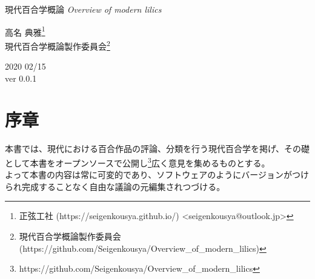 \documentclass[ %
	uplatex,%
	a5paper,%
	papersize%
	]{jsbook}
\begin{document}
						\begin{titlepage}
							\pagecolor{black}
							\color{white}
							\renewcommand{\thefootnote}{\textcolor{red}{\fnsymbol{footnote}}}
							
							\begin{center}
								\vspace*{20mm}
								\fontsize{36pt}{0pt} \selectfont
								現代百合学概論
								\vspace*{5mm}
								\fontsize{21pt}{3pt} \selectfont
								{\sl Overview of modern lilics}
								\vspace{30mm}

								{\LARGE 高名 典雅\footnote[2]{\color{white}正弦工社 (https://seigenkousya.github.io/) <seigenkousya@outlook.jp>}}
								\vspace{2mm}\\
								\color{white}
								{\LARGE 現代百合学概論製作委員会\footnote[3]{\color{white}現代百合学概論製作委員会(https://github.com/Seigenkousya/Overview\_of\_modern\_lilics)}}
								\vspace{10mm}\\
		
								\begin{flushright}
									\color{white}
									{\rm \Large 2020 02/15}\vspace{2mm}\\
									{\rm \Large ver 0.0.1}
								\end{flushright}

								\vspace{10mm}
							\end{center}
						\end{titlepage}

						\pagecolor{white}
						\color{black}
						\frontmatter

						\chapter{序章}

						本書では、現代における百合作品の評論、分類を行う現代百合学を掲げ、その礎として本書をオープンソースで公開し\footnote{https://github.com/Seigenkousya/Overview\_of\_modern\_lilics}広く意見を集めるものとする。\\
						よって本書の内容は常に可変的であり、ソフトウェアのようにバージョンがつけられ完成することなく自由な議論の元編集されつづける。
\end{document}
